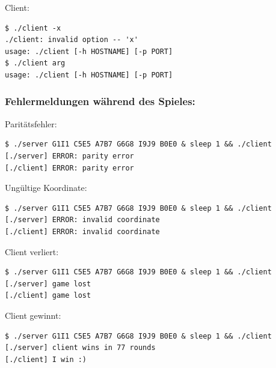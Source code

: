 Client:
\vspace{-10pt}
\begin{verbatim}
$ ./client -x
./client: invalid option -- 'x'
usage: ./client [-h HOSTNAME] [-p PORT]
$ ./client arg
usage: ./client [-h HOSTNAME] [-p PORT]
\end{verbatim}

\subsubsection*{Fehlermeldungen während des Spieles:}
\vspace{-10pt}
Paritätsfehler:
\vspace{-10pt}
\begin{verbatim}
$ ./server G1I1 C5E5 A7B7 G6G8 I9J9 B0E0 & sleep 1 && ./client
[./server] ERROR: parity error
[./client] ERROR: parity error
\end{verbatim}

Ungültige Koordinate:
\vspace{-10pt}
\begin{verbatim}
$ ./server G1I1 C5E5 A7B7 G6G8 I9J9 B0E0 & sleep 1 && ./client
[./server] ERROR: invalid coordinate
[./client] ERROR: invalid coordinate
\end{verbatim}

Client verliert:
\vspace{-10pt}
\begin{verbatim}
$ ./server G1I1 C5E5 A7B7 G6G8 I9J9 B0E0 & sleep 1 && ./client
[./server] game lost
[./client] game lost
\end{verbatim}

Client gewinnt:
\vspace{-10pt}
\begin{verbatim}
$ ./server G1I1 C5E5 A7B7 G6G8 I9J9 B0E0 & sleep 1 && ./client
[./server] client wins in 77 rounds
[./client] I win :)
\end{verbatim}

\osueguidelinesone



